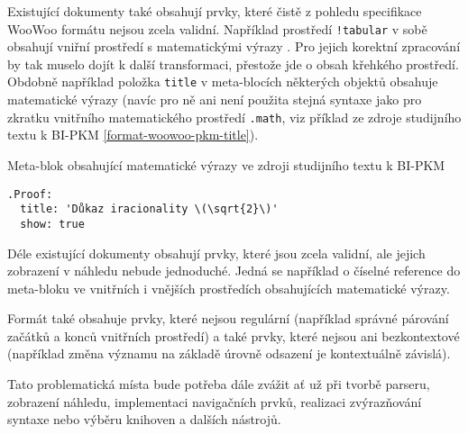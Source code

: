 Existující dokumenty také obsahují prvky, které čistě z pohledu specifikace WooWoo formátu nejsou zcela validní.
Například prostředí \texttt{!tabular} v sobě obsahují vniřní prostředí s matematickými výrazy \cite{pkm}. Pro
jejich korektní zpracování by tak muselo dojít k další transformaci, přestože jde o obsah křehkého prostředí. Obdobně
například položka \texttt{title} v meta-blocích některých objektů obsahuje matematické výrazy (navíc pro ně
ani není použita stejná syntaxe jako pro zkratku vnitřního matematického prostředí \texttt{.math}, viz příklad
ze zdroje studijního textu k BI-PKM \ref{format-woowoo-pkm-title}).

\begin{listing}
    \caption{Meta-blok obsahující matematické výrazy ve zdroji studijního textu k BI-PKM \cite{pkm}}
    \label{format-woowoo-pkm-title}
    \begin{verbatim}
.Proof:
  title: 'Důkaz iracionality \(\sqrt{2}\)'
  show: true
    \end{verbatim}
\end{listing}

Déle existující dokumenty obsahují prvky, které jsou zcela validní, ale jejich zobrazení v náhledu nebude jednoduché.
Jedná se například o číselné reference do meta-bloku ve vnitřních i vnějších prostředích obsahujících matematické
výrazy.

Formát také obsahuje prvky, které nejsou regulární (například správné párování začátků a konců vnitřních prostředí) a
také prvky, které nejsou ani bezkontextové (například změna významu na základě úrovně odsazení je kontextuálně závislá).

Tato problematická místa bude potřeba dále zvážit ať už při tvorbě parseru, zobrazení náhledu, implementaci navigačních
prvků, realizaci zvýrazňování syntaxe nebo výběru knihoven a dalších nástrojů.
